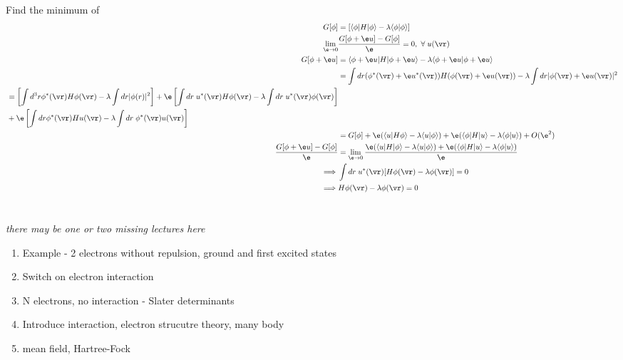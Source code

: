 \documentclass[a4paper, 11pt, normalem]{report}
\begin{document}
\chapter{}
Find the minimum of
\begin{align}
    G[\phi] &= \left[\langle\phi|H|\phi\rangle - \lambda\langle\phi|\phi\rangle\right] \\
    \lim_{\e\to 0}& \frac{G[\phi + \e u] - G[\phi]}{\e} = 0, ~\forall\; u(\vr) \\
    G[\phi + \e u] &= \langle\phi+\e u|H|\phi+\e u\rangle - \lambda\langle\phi+\e u|\phi+\e u\rangle \\
                   &= \int dr (\phi^*(\vr) + \e u^*(\vr))H(\phi(\vr)+\e u(\vr)) - \lambda\int dr |\phi(\vr) + \e u(\vr)|^2 \\
    \begin{split}
                   &= \left[\int d^3r \phi^*(\vr)H\phi(\vr) - \lambda\int dr |\phi(r)|^2\right] + \e\left[\int dr \;u^*(\vr)H\phi(\vr) - \lambda\int dr\; u^*(\vr)\phi(\vr)\right] \\
                   &+ \e\left[\int dr \phi^*(\vr)Hu(\vr) - \lambda\int dr\;\phi^*(\vr)u(\vr)\right]
    \end{split} \\
                   &= G[\phi] + \e(\langle u|H\phi\rangle -\lambda\langle u|\phi\rangle) + \e(\langle\phi|H|u\rangle -\lambda\langle\phi|u\rangle) + O(\e^2) \\
    \frac{G[\phi+\e u] - G[\phi]}{\e} &= \lim_{\e\to 0} \frac{\e(\langle u|H|\phi\rangle - \lambda\langle u|\phi\rangle) + \e(\langle\phi|H|u\rangle - \lambda\langle\phi|u\rangle)}{\e} \\
    \implies& \int dr\;u^*(\vr)[H\phi(\vr) - \lambda\phi(\vr)] = 0 \\
    \implies& H\phi(\vr) - \lambda\phi(\vr) = 0
\end{align}

\chapter{}
\textit{there may be one or two missing lectures here}

\begin{enumerate}
    \item Example - 2 electrons without repulsion, ground and first excited states
    \item Switch on electron interaction
    \item N electrons, no interaction - Slater determinants
    \item Introduce interaction, electron strucutre theory, many body
    \item mean field, Hartree-Fock
\end{enumerate}
\end{document}

